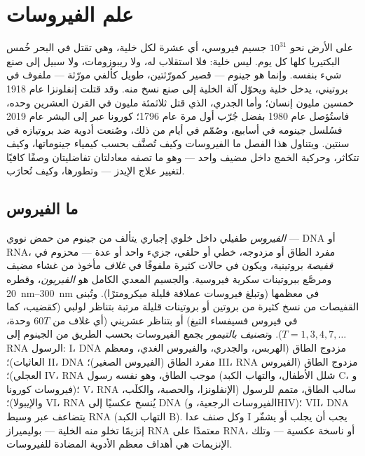 \chapter{علم الفيروسات}\label{ch:b3:virology}

على الأرض نحو $10^{31}$ جسيم فيروسي، أي عشرة لكل خلية،
وهي تقتل في البحر خُمس البكتيريا كلها كل يوم. 
ليس خلية: فلا استقلاب له، ولا ريبوزومات، ولا سبيل إلى صنع شيء
بنفسه. وإنما هو جينوم --- قصير كمورّثتين، طويل كألفي
مورّثة --- ملفوف في  بروتيني، يدخل خلية ويحوّل
آلة الخلية إلى صنع نسخ منه. وقد قتلت إنفلونزا عام 1918
خمسين مليون إنسان؛ وأما الجدري، الذي قتل ثلاثمئة
مليون في القرن العشرين وحده، فاستُؤصل عام 1980 بفضل
 جُرّب أول مرة عام 1796؛  كورونا عبر إلى البشر
عام 2019 فسُلسل جينومه في أسابيع، وصُمّم  في
أيام من ذلك، وصُنعت أدوية ضد بروتيازه في سنتين. ويتناول هذا
الفصل ما الفيروسات وكيف تُصنَّف بحسب
كيمياء جينوماتها، وكيف تتكاثر، وحركية
الخمج داخل مضيف واحد --- وهو ما تصفه معادلتان تفاضليتان
وصفًا كافيًا لتغيير علاج الإيدز --- وتطورها،
وكيف تُحارَب.

\section{ما الفيروس}

\begin{definition}[الفيروس]\label{def:b3:virology:virus}
\emph{الفيروس} طفيلي داخل خلوي إجباري يتألف من
جينوم من حمض نووي --- DNA أو RNA، مفرد الطاق أو مزدوجه، خطي
أو حلقي، جزيء واحد أو عدة --- محزوم في \emph{قفيصة}
بروتينية، ويكون في حالات كثيرة ملفوفًا في \emph{غلاف} مأخوذ
من غشاء مضيف ومرصَّع ببروتينات سكرية فيروسية. والجسيم
المعدي الكامل هو \emph{الفيريون}، وقطره \qtyrange{20}{300}{nm}
في معظمها (وتبلغ فيروسات عملاقة قليلة ميكرومترًا). وتُبنى القفيصات
من نسخ كثيرة من بروتين أو بروتينات قليلة مرتبة بتناظر
لولبي (كقضيب، كما في فيروس فسيفساء التبغ) أو بتناظر عشريني (أي
غلاف من $60T$ وحدة، $T = 1, 3, 4, 7,\dots$). و\emph{تصنيف
بالتيمور} يجمع الفيروسات بحسب الطريق من الجينوم إلى RNA
الرسول: I، DNA مزدوج الطاق (الهربس، والجدري، والفيروس الغدي، ومعظم العاثيات)؛ II،
DNA مفرد الطاق (الفيروس الصغير)؛ III، RNA مزدوج الطاق (الفيروس العجلي)؛
IV، RNA موجب الطاق، وهو نفسه رسول (شلل الأطفال، والتهاب الكبد C، و
فيروسات كورونا)؛ V، RNA سالب الطاق، متمم للرسول
(الإنفلونزا، والحصبة، والكلَب، والإيبولا)؛ VI، RNA يُنسخ عكسيًا إلى
DNA (الفيروسات الرجعية، وHIV)؛ VII، DNA يتضاعف عبر وسيط RNA
(التهاب الكبد B). وكل صنف عدا I يجب أن يجلب أو يشفّر
إنزيمًا تخلو منه الخلية --- بوليميراز RNA معتمدًا على RNA، أو ناسخة
عكسية --- وتلك الإنزيمات هي أهداف معظم الأدوية المضادة
للفيروسات.
\end{definition}

